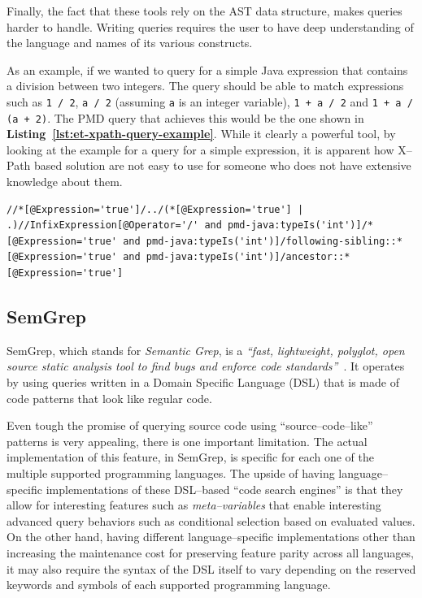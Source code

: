 \begin{chapterBody}
Finally, the fact that these tools rely on the AST data structure, makes
queries harder to handle. Writing queries requires the user to have deep
understanding of the language and names of its various constructs.

As an example, if we wanted to query for a simple Java expression that contains
a division between two integers. The query should be able to match expressions
such as \lstinline{1 / 2}, \lstinline{a / 2} (assuming \texttt{a} is an
integer variable), \lstinline{1 + a / 2} and \lstinline{1 + a / (a + 2)}.
The PMD query that achieves this would be the one shown in
\textbf{Listing~\ref{lst:et-xpath-query-example}}. While it clearly
a powerful tool, by looking at the example for a query for a simple expression,
it is apparent how X–Path based solution are not easy to use for someone who
does not have extensive knowledge about them.

\begin{lstlisting}[label={lst:et-xpath-query-example},
                   caption={X–Path query for PMD. This query looks for
                            expressions that contain a division between
                            two integers.},
                   language=xpath]
//*[@Expression='true']/../(*[@Expression='true'] | .)//InfixExpression[@Operator='/' and pmd-java:typeIs('int')]/*[@Expression='true' and pmd-java:typeIs('int')]/following-sibling::*[@Expression='true' and pmd-java:typeIs('int')]/ancestor::*[@Expression='true']
\end{lstlisting}

\subsection{SemGrep}

SemGrep, which stands for \textit{Semantic Grep}, is a \textit{``fast,
lightweight, polyglot, open source static analysis tool to find bugs and
enforce code standards''}~\cite{padioleau_semgrep_2021}.
It operates by using queries written in a Domain Specific Language (DSL) that is
made of code patterns that look like regular code.

Even tough the promise of querying source code using ``source–code–like''
patterns is very appealing, there is one important limitation.
The actual implementation of this feature, in SemGrep, is specific for each one
of the multiple supported programming languages.
The upside of having language–specific implementations of these DSL–based 
``code search engines'' is that they allow for interesting features such as
\textit{meta–variables} that enable interesting advanced query behaviors such
as conditional selection based on evaluated values.
On the other hand, having different language–specific implementations other
than increasing the maintenance cost for preserving feature parity across all
languages, it may also require the syntax of the DSL itself to vary depending
on the reserved keywords and symbols of each supported programming language.


\end{chapterBody}
